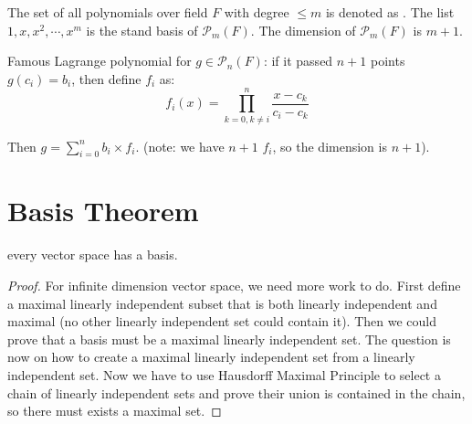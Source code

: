 \begin{definition}
    The set of all polynomials over field $F$ with degree $\leq m$ is denoted as . The list $1, x, x^2, \cdots, x^m$ is the stand basis of $\mathcal{P}_m (F)$. The dimension of $\mathcal{P}_m (F)$ is $m+1$.
\end{definition}

\begin{example}
   Famous Lagrange polynomial for $g \in \mathcal{P}_n (F)$: if it passed $n+1$ points $g(c_i) = b_i$, then define $f_i$ as:
\begin{equation}
    f_i(x) = \prod_{k=0,k \neq i}^{n} \frac{x - c_k}{c_i - c_k}
\end{equation}

Then $\displaystyle g = \sum_{i=0}^{n} b_i \times f_i $. (note: we have $n+1$ $f_i$, so the dimension is $n+1$). 
\end{example}



\section{Basis Theorem}
\begin{theorem}
    every vector space has a basis.
\end{theorem}
\begin{proof}
    For infinite dimension vector space, we need more work to do. First define a maximal linearly independent subset that is both linearly independent and maximal (no other linearly independent set could contain it). Then we could prove that a basis must be a maximal linearly independent set. The question is now on how to create a maximal linearly independent set from a linearly independent set. Now we have to use Hausdorff Maximal Principle to select a chain of linearly independent sets and prove their union is contained in the chain, so there must exists a maximal set.
\end{proof}



















